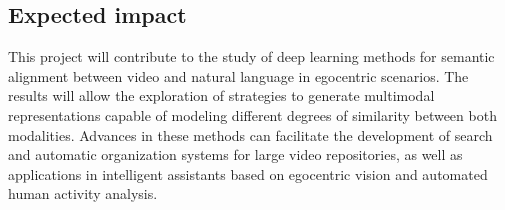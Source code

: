 \subsection{Expected impact}

This project will contribute to the study of deep learning methods for semantic alignment between video and natural language in egocentric scenarios. The results will allow the exploration of strategies to generate multimodal representations capable of modeling different degrees of similarity between both modalities. Advances in these methods can facilitate the development of search and automatic organization systems for large video repositories, as well as applications in intelligent assistants based on egocentric vision and automated human activity analysis.
